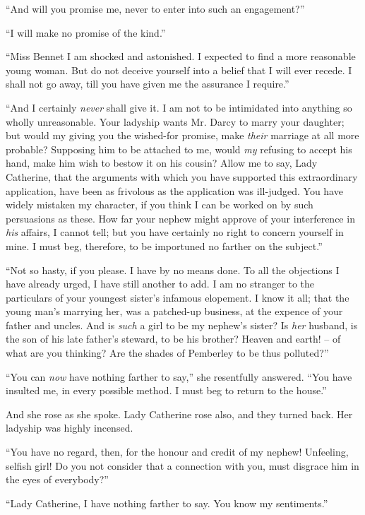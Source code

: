 “And will you promise me, never to enter into such an
engagement?”

“I will make no promise of the kind.”

“Miss Bennet I am shocked and astonished. I expected
to find a more reasonable young woman. But do not
deceive yourself into a belief that I will ever recede.
I shall not go away, till you have given me the assurance
I require.”

“And I certainly \textit{never} shall give it. I am not to be
intimidated into anything so wholly unreasonable. Your
ladyship wants Mr. Darcy to marry your daughter; but
would my giving you the wished-for promise, make \textit{their}
marriage at all more probable? Supposing him to be
attached to me, would \textit{my} refusing to accept his hand,
make him wish to bestow it on his cousin? Allow me to
say, Lady Catherine, that the arguments with which you
have supported this extraordinary application, have been
as frivolous as the application was ill-judged. You have
widely mistaken my character, if you think I can be
worked on by such persuasions as these. How far your
nephew might approve of your interference in \textit{his} affairs,
I cannot tell; but you have certainly no right to concern
yourself in mine. I must beg, therefore, to be importuned
no farther on the subject.”

“Not so hasty, if you please. I have by no means
done. To all the objections I have already urged, I have
still another to add. I am no stranger to the particulars
of your youngest sister’s infamous elopement. I know
it all; that the young man’s marrying her, was a patched-up
business, at the expence of your father and uncles.
And is \textit{such} a girl to be my nephew’s sister? Is \textit{her} husband,
is the son of his late father’s steward, to be his brother?
Heaven and earth! -- of what are you thinking? Are the
shades of Pemberley to be thus polluted?”

“You can \textit{now} have nothing farther to say,” she resentfully
answered. “You have insulted me, in every possible
method. I must beg to return to the house.”

And she rose as she spoke. Lady Catherine rose also,
and they turned back. Her ladyship was highly
incensed.

“You have no regard, then, for the honour and credit
of my nephew! Unfeeling, selfish girl! Do you not consider
that a connection with you, must disgrace him in
the eyes of everybody?”

“Lady Catherine, I have nothing farther to say. You
know my sentiments.”

